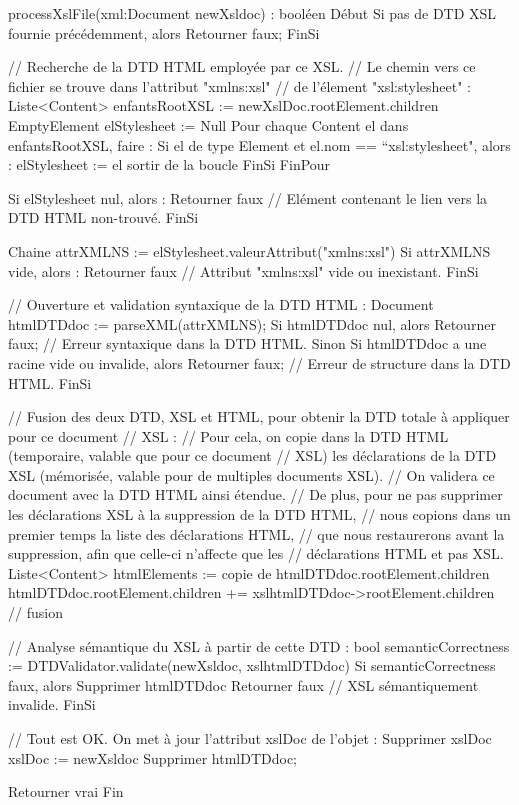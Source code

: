 \documentclass[10pt,a4paper]{article}
\begin{document}
\begin{verbatimtab}
processXslFile(xml:Document newXsldoc) : booléen
Début
	Si pas de DTD XSL fournie précédemment, alors
		Retourner faux;
	FinSi
	
	// Recherche de la DTD HTML employée par ce XSL.
	// Le chemin vers ce fichier se trouve dans l’attribut "xmlns:xsl" 
	// de l’élement "xsl:stylesheet" :
	Liste<Content> enfantsRootXSL := newXslDoc.rootElement.children
	EmptyElement elStylesheet := Null
	Pour chaque Content el dans enfantsRootXSL, faire :
		Si el de type Element et el.nom == “xsl:stylesheet", alors :
			elStylesheet := el
			sortir de la boucle
		FinSi
	FinPour
    
	Si elStylesheet nul, alors :
		Retourner faux // Elément contenant le lien vers la DTD HTML non-trouvé.
	FinSi
    
	Chaine attrXMLNS := elStylesheet.valeurAttribut("xmlns:xsl")
	Si attrXMLNS vide, alors :
		Retourner faux // Attribut "xmlns:xsl" vide ou inexistant.
	FinSi
	
	// Ouverture et validation syntaxique de la DTD HTML :
	Document htmlDTDdoc := parseXML(attrXMLNS);
	Si htmlDTDdoc nul, alors
		Retourner faux; // Erreur syntaxique dans la DTD HTML.
	Sinon Si htmlDTDdoc a une racine vide ou invalide, alors
		Retourner faux; // Erreur de structure dans la DTD HTML.
	FinSi
	
	// Fusion des deux DTD, XSL et HTML, pour obtenir la DTD totale à appliquer pour ce document
	// XSL : 
	// Pour cela, on copie dans la DTD HTML (temporaire, valable que pour ce document 
	// XSL) les déclarations de la DTD XSL (mémorisée, valable pour de multiples documents XSL).
	// On validera ce document avec la DTD HTML ainsi étendue.
	// De plus, pour ne pas supprimer les déclarations XSL à la suppression de la DTD HTML, 
	// nous copions dans un premier temps la liste des déclarations HTML, 
	// que nous restaurerons avant la suppression, afin que celle-ci n’affecte que les
	// déclarations HTML et pas XSL.
	Liste<Content> htmlElements := copie de htmlDTDdoc.rootElement.children
	htmlDTDdoc.rootElement.children += xslhtmlDTDdoc->rootElement.children // fusion
	
	// Analyse sémantique du XSL à partir de cette DTD :
	bool semanticCorrectness :=  DTDValidator.validate(newXsldoc, xslhtmlDTDdoc)
	Si semanticCorrectness faux, alors
		Supprimer htmlDTDdoc
		Retourner faux // XSL sémantiquement invalide.
	FinSi

	// Tout est OK. On met à jour l’attribut xslDoc de l’objet :
	Supprimer xslDoc
	xslDoc := newXsldoc
	Supprimer htmlDTDdoc;

	Retourner vrai
Fin
\end{verbatimtab}
\end{document}
